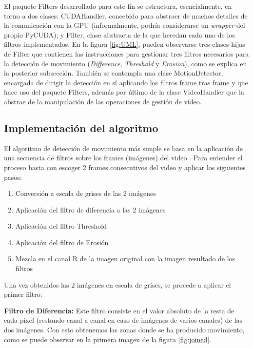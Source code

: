 \documentclass[twocolumn,twoside]{Jornadas}
\begin{document}

El paquete Filters desarrollado para este fin se estructura, esencialmente, en torno a dos clases: CUDAHandler, concebido para abstraer de muchos detalles de la comunicación con la GPU (informalmente, podría considerarse un \emph{wrapper} del propio  PyCUDA); y Filter, clase abstracta de la que heredan cada uno de los filtros implementados. En la figura \ref{fig:UML}, pueden observarse tres clases hijas de Filter que contienen las instrucciones para gestionar tres filtros necesarios para la detección de movimiento (\emph{Difference}, \emph{Threshold} y \emph{Erosion}), como se explica en la posterior subsección. También se contempla una clase MotionDetector, encargada de dirigir la detección en sí aplicando los filtros frame tras frame y que hace uso del paquete Filters, además por último de la clase VideoHandler que la abstrae de la manipulación de las operaciones de gestión de vídeo.


\subsection{Implementación del algoritmo}

El algoritmo de detección de movimiento más simple se basa en la aplicación de una secuencia de filtros sobre los frames (imágenes) del video \cite{codeproject}.
Para entender el proceso basta con escoger 2 frames consecutivos del video y aplicar los siguientes pasos:

\begin{enumerate}
   \item Conversión a escala de grises de las 2 imágenes
   \item Aplicación del filtro de diferencia a las 2 imágenes
   \item Aplicación del filtro Threshold
   \item Aplicación del filtro de Erosión
   \item Mezcla en el canal R de la imagen original con la imagen resultado de los filtros
\end{enumerate}


Una vez obtenidos las 2 imágenes en escala de grises, se procede a aplicar el primer filtro:

\textbf{Filtro de Diferencia:} Este filtro consiste en el valor absoluto de la resta de cada píxel (restando canal a canal en caso de imágenes de varios canales) de las dos imágenes. Con esto obtenemos las zonas donde se ha producido movimiento, como se puede observar en la primera imagen de la figura \ref{fig:joined}.
\end{document}
